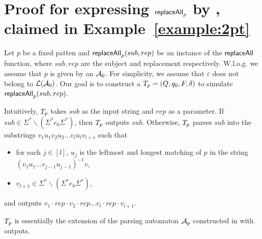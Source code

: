 

\section{Proof for expressing $\mathsf{replaceAll}_p$ by \PT, claimed in Example~\ref{example:2pt}} \label{appendix:replace2pt}

Let $p$ be a fixed patten and $\mathsf{replaceAll}_p(sub, rep)$ be an instance of the $\mathsf{replaceAll}$ function, where $sub, rep$ are the subject and replacement respectively. W.l.o.g. we assume that $p$ is given by an \FA{} $\mathcal{A}_0$. For simplicity, we assume that $\varepsilon$ does not belong to $\mathcal{L}(\mathcal{A}_0)$. Our goal is to construct a \PT{} $T_p = (Q, q_0, F, \delta)$ to simulate $\mathsf{replaceAll}_p(sub, rep)$.

Intuitively, $T_p$ takes $sub$ as the input string and $rep$ as a parameter. If $sub \in \Sigma^* \backslash (\Sigma^\ast e_0 \Sigma^\ast)$, then $T_p$ outputs $sub$. Otherwise, $T_p$ parses $sub$ into the substrings $v_1 u_1 v_2 u_2 \ldots v_l u_l v_{l+1}$ such that
\begin{itemize}
	\item for each $j \in [l]$, $u_j$ is the leftmost and longest matching of $p$ in the string $(v_1 u_1 \ldots v_{j-1} u_{j-1})^{-1} v$,
	\item $v_{l+1} \in \Sigma^* \backslash (\Sigma^\ast e_0 \Sigma^\ast)$,
\end{itemize}
and outputs $v_1\cdot rep \cdot v_2 \cdot rep \ldots v_l \cdot rep \cdot v_{l+1}$. 

$T_p$ is essentially the extension of the parsing automaton $\mathcal{A}_p$ constructed in \cite{CCHLW18} with outputs.

